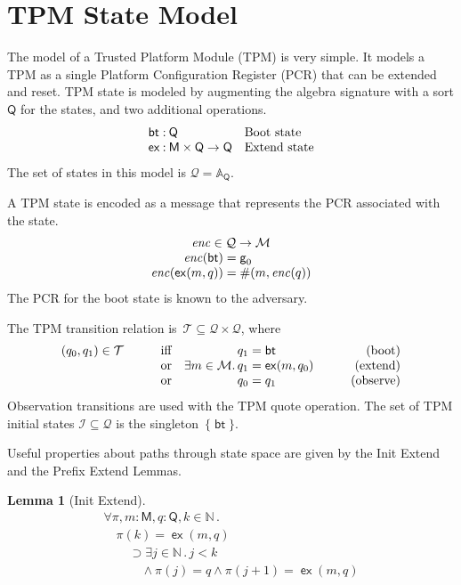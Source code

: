 \documentclass[12pt]{article}
\newtheorem{lem}[thm]{Lemma}
\newcommand{\cn}[1]{\ensuremath{\operatorname{\mathsf{#1}}}}
\newcommand{\fn}[1]{\ensuremath{\operatorname{\mathit{#1}}}}
\newcommand{\srt}[1]{\ensuremath{\mathsf{#1}}}
\newcommand{\typ}{\mathbin:}
\newcommand{\nat}{\ensuremath{\mathbb{N}}}
\newcommand{\all}[1]{\forall#1\mathpunct.}
\newcommand{\some}[1]{\exists#1\mathpunct.}
\newcommand{\alg}{\ensuremath{\mathbb{A}}}
\newcommand{\msg}{\ensuremath{\mathcal{M}}}
\newcommand{\sta}{\ensuremath{\mathcal{Q}}}
\newcommand{\boot}{\cn{bt}}
\newcommand{\extend}{\cn{ex}}
\newcommand{\init}{\ensuremath{\mathcal{I}}}
\newcommand{\tran}{\ensuremath{\mathcal{T}}}
\newcommand{\pth}{\ensuremath{\pi}}
\newcommand{\encode}{\fn{enc}}
\begin{document}
\section{TPM State Model}
\label{sec:tpm}

The model of a Trusted Platform Module (TPM) is very simple.  It
models a TPM as a single Platform Configuration Register (PCR) that
can be extended and reset.  TPM state is modeled by augmenting the
algebra signature with a sort \srt{Q} for the states, and two
additional operations.
$$\begin{array}{l@{{}\typ{}}ll}
\boot&\srt{Q}&\mbox{Boot state}\\
\extend&\srt{M}\times\srt{Q}\to\srt{Q}&\mbox{Extend state}
\end{array}$$
The set of states in this model is $\sta=\alg_\srt{Q}$.

A TPM state is encoded as a message that represents the PCR associated
with the state.
$$\begin{array}{r@{{}={}}l}
\multicolumn{2}{c}{\encode\in\sta\to\msg}\\
\encode(\boot)&\cn{g}_0\\
\encode(\extend(m, q))&\#(m,\encode(q))
\end{array}$$
The PCR for the boot state is known to the adversary.

The TPM transition relation
is~$\tran\subseteq\sta\times\sta$, where
\[\begin{array}{llr@{{}={}}lr}
  (q_0, q_1)\in\tran\qquad
&\text{iff}&q_1&\boot & \mbox{(boot)} \\
&\text{or}&\some{m\in\msg} q_1& \cn{ex}(m,q_0) &
\mbox{(extend)} \\
&\text{or}& q_0 &q_1&\qquad
\mbox{(observe)}
\end{array}\]
Observation transitions are used with the TPM quote operation.  The
set of TPM initial states $\init\subseteq\sta$ is the
singleton~$\{\boot\}$.

Useful properties about paths through state space are given by the Init
Extend and the Prefix Extend Lemmas.


\begin{lem}[Init Extend]\label{lem:init extend}
\begingroup\rm
\[\begin{array}{l}
\all{\pth,m\typ\srt{M},q\typ\srt{Q},k\in\nat}\\
\quad\pth(k)=\extend(m,q)\\
\qquad\supset\some{j\in\nat}j<k\\
\qquad\quad{}\land\pth(j)=q\land\pth(j+1)=\extend(m,q)
\end{array}\]
\endgroup
\end{lem}
\end{document}
